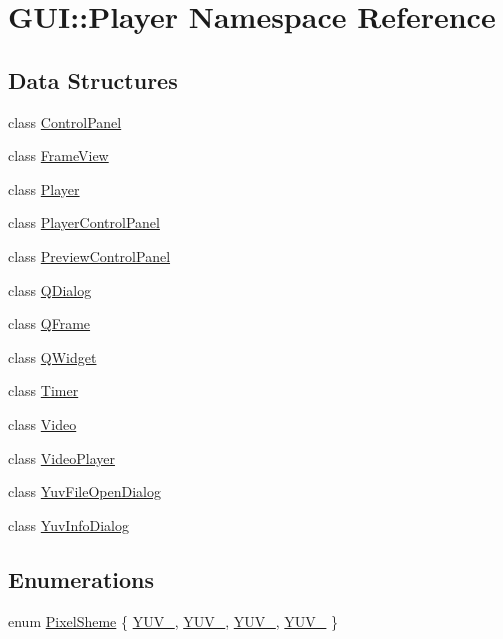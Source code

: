 \hypertarget{namespaceGUI_1_1Player}{}\section{G\+U\+I\+:\+:Player Namespace Reference}
\label{namespaceGUI_1_1Player}
\subsection*{Data Structures}
\begin{DoxyCompactItemize}
\item 
class \hyperlink{classGUI_1_1Player_1_1ControlPanel}{Control\+Panel}
\item 
class \hyperlink{classGUI_1_1Player_1_1FrameView}{Frame\+View}
\item 
class \hyperlink{classGUI_1_1Player_1_1Player}{Player}
\item 
class \hyperlink{classGUI_1_1Player_1_1PlayerControlPanel}{Player\+Control\+Panel}
\item 
class \hyperlink{classGUI_1_1Player_1_1PreviewControlPanel}{Preview\+Control\+Panel}
\item 
class \hyperlink{classGUI_1_1Player_1_1QDialog}{Q\+Dialog}
\item 
class \hyperlink{classGUI_1_1Player_1_1QFrame}{Q\+Frame}
\item 
class \hyperlink{classGUI_1_1Player_1_1QWidget}{Q\+Widget}
\item 
class \hyperlink{classGUI_1_1Player_1_1Timer}{Timer}
\item 
class \hyperlink{classGUI_1_1Player_1_1Video}{Video}
\item 
class \hyperlink{classGUI_1_1Player_1_1VideoPlayer}{Video\+Player}
\item 
class \hyperlink{classGUI_1_1Player_1_1YuvFileOpenDialog}{Yuv\+File\+Open\+Dialog}
\item 
class \hyperlink{classGUI_1_1Player_1_1YuvInfoDialog}{Yuv\+Info\+Dialog}
\end{DoxyCompactItemize}
\subsection*{Enumerations}
\begin{DoxyCompactItemize}
\item 
enum \hyperlink{namespaceGUI_1_1Player_a52432774abcaf0c8c417ae77739fccfc}{Pixel\+Sheme} \{ \hyperlink{namespaceGUI_1_1Player_a52432774abcaf0c8c417ae77739fccfca2e06ee24527f23dc25f617ad0f9713bc}{Y\+U\+V\+\_}, 
\hyperlink{namespaceGUI_1_1Player_a52432774abcaf0c8c417ae77739fccfca781089d5d11a2ece9648807b48a2eb3f}{Y\+U\+V\+\_}, 
\hyperlink{namespaceGUI_1_1Player_a52432774abcaf0c8c417ae77739fccfca3c43e5ef2c058b5c01a870d654cde699}{Y\+U\+V\+\_}, 
\hyperlink{namespaceGUI_1_1Player_a52432774abcaf0c8c417ae77739fccfcab10bce70451573b2d9e48c169151af93}{Y\+U\+V\+\_}
 \}
\end{DoxyCompactItemize}


